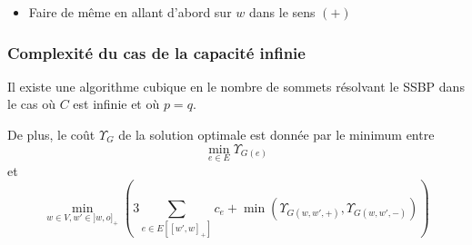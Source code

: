 \begin{frame}[label=AlgoCapaciteInfinie]
\begin{center}
\begin{minipage}[c]{\linewidth}
\begin{minipage}[c]{.8\linewidth}
\begin{itemize}
          \begin{enumerate}
          \item<7-> aller jusqu'à $w'$ dans le sens $(-)$
          \item<8-> aller jusqu'à $w$ dans le sens $(+)$ en ramassant tous les vélos
          \item<9-> Construire le graphe linéaire $\bs{G(w,w',+)}$
          \item<10-> Résoudre le SSBP sur $\bs{G(w,w',+)}$\\
          (algorithme dans le cas linéaire)
          \item<12-> aller jusqu'à $w$ dans le sens $(+)$ en équilibrant toutes les stations
          \item<13-> revenir en $p$ dans le sens $(-)$
          \end{enumerate}
        \item<14-> Faire de même en allant d'abord sur $w$ dans le sens $(+)$
        \end{itemize}
      \end{minipage}
    \end{minipage}
  \end{center}
\end{frame}

\begin{frame}[label=OptimaliteCapaciteInfinie]
  \frametitle{Complexité du cas de la capacité infinie}

  \begin{thm} \label{thm: optimalité algo infini}
  Il existe une algorithme cubique en le nombre de sommets résolvant le SSBP dans le cas où $C$ est infinie et où $p=q$.

  De plus, le coût $\Upsilon_{G}$ de la solution optimale est donnée par le minimum entre
  $$
    \min_{e \in E} \Upsilon_{G(e)}
  $$
  et
  $$
    \min_{w \in V, w' \in ]w,o]_+}
    \left(
      3 \sum_{ e \in E\left[ \left[w',w\right]_+ \right] }c_e + \min \left( \Upsilon_{G(w,w',+)} , \Upsilon_{G(w,w',-)} \right)
    \right)
  $$
  \end{thm}
\end{frame}

